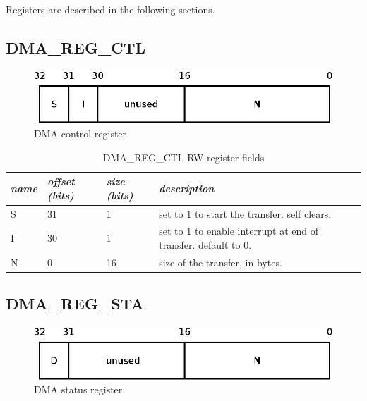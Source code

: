 \documentclass[a4paper, 11pt]{article}
\begin{document}
\paragraph{}
Registers are described in the following sections.

\newpage
\subsection{DMA\_REG\_CTL}

\begin{figure}[!h]
\begin{center}
\includegraphics[scale=0.20]{../pic/dma_reg_ctl/main.jpeg}
\end{center}
\caption{\tiny{DMA control register}}
\label{dma_reg_ctl}
\end{figure}

\begin{table}[!h]
\centering
\begin{scriptsize}
\begin{tabular}{|p{1cm}|p{1.5cm}|p{1.5cm}|p{10cm}|}
  \hline
  \textit{name} & \textit{offset (bits)} & \textit{size (bits)} & \textit{description} \\
  \hline
  S
  &
  31
  &
  1
  &
  set to 1 to start the transfer. self clears. \\
  \hline
  I
  &
  30
  &
  1
  &
  set to 1 to enable interrupt at end of transfer. default to 0. \\
  \hline
  N
  &
  0
  &
  16
  &
  size of the transfer, in bytes. \\
  \hline
\end{tabular}
\end{scriptsize}
\caption{\tiny{DMA\_REG\_CTL RW register fields}}
\label{tab:dma_reg_ctl_fields}
\end{table}

\newpage
\subsection{DMA\_REG\_STA}

\begin{figure}[!h]
\begin{center}
\includegraphics[scale=0.20]{../pic/dma_reg_sta/main.jpeg}
\end{center}
\caption{\tiny{DMA status register}}
\label{dma_reg_sta}
\end{figure}
\end{document}
